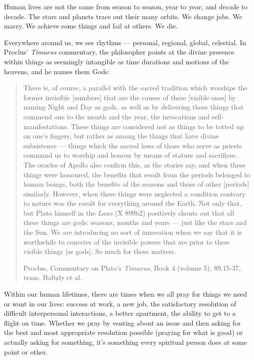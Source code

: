 \documentclass[
]{book}
\begin{document}
Human lives are not the same from season to season, year to year, and decade to decade. The stars and planets trace out their many orbits. We change jobs. We marry. We achieve some things and fail at others. We die.

Everywhere around us, we see rhythms --- personal, regional, global, celestial. In Proclus' \emph{Timaeus} commentary, the philosopher points at the divine presence within things as seemingly intangible as time durations and motions of the heavens, and he names them Gods:

\begin{quote}
There is, of course, a parallel with the sacred tradition which worships the former invisible {[}numbers{]} that are the causes of these {[}visible ones{]} by naming Night and Day as gods, as well as by delivering those things that commend one to the month and the year, the invocations and self-manifestations. These things are considered not as things to be totted up on one's fingers, but rather as among the things that have divine subsistence --- things which the sacred laws of those who serve as priests command us to worship and honour by means of statues and sacrifices. The oracles of Apollo also confirm this, as the stories say, and when these things were honoured, the benefits that result from the periods belonged to human beings, both the benefits of the seasons and those of other {[}periods{]} similarly. However, when these things were neglected a condition contrary to nature was the result for everything around the Earth. Not only that, but Plato himself in the \emph{Laws} (X 899b2) positively shouts out that all these things are gods: seasons, months and years --- just like the stars and the Sun. We are introducing no sort of innovation when we say that it is worthwhile to conceive of the invisible powers that are prior to these visible things {[}as gods{]}. So much for these matters.

Proclus, Commentary on Plato's \emph{Timaeus}, Book 4 (volume 5), 89.15-37, trans. Baltzly et al.
\end{quote}

Within our human lifetimes, there are times when we all pray for things we need or want in our lives: success at work, a new job, the satisfactory resolution of difficult interpersonal interactions, a better apartment, the ability to get to a flight on time. Whether we pray by venting about an issue and then asking for the best and most appropriate resolution possible (praying for what is good) or actually asking for something, it's something every spiritual person does at some point or other.
\end{document}
